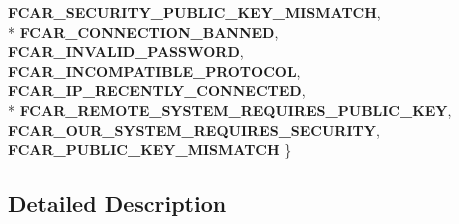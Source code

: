 \begin{DoxyCompactItemize}
{\bfseries F\-C\-A\-R\-\_\-\-S\-E\-C\-U\-R\-I\-T\-Y\-\_\-\-P\-U\-B\-L\-I\-C\-\_\-\-K\-E\-Y\-\_\-\-M\-I\-S\-M\-A\-T\-C\-H}, 
\\*
{\bfseries F\-C\-A\-R\-\_\-\-C\-O\-N\-N\-E\-C\-T\-I\-O\-N\-\_\-\-B\-A\-N\-N\-E\-D}, 
{\bfseries F\-C\-A\-R\-\_\-\-I\-N\-V\-A\-L\-I\-D\-\_\-\-P\-A\-S\-S\-W\-O\-R\-D}, 
{\bfseries F\-C\-A\-R\-\_\-\-I\-N\-C\-O\-M\-P\-A\-T\-I\-B\-L\-E\-\_\-\-P\-R\-O\-T\-O\-C\-O\-L}, 
{\bfseries F\-C\-A\-R\-\_\-\-I\-P\-\_\-\-R\-E\-C\-E\-N\-T\-L\-Y\-\_\-\-C\-O\-N\-N\-E\-C\-T\-E\-D}, 
\\*
{\bfseries F\-C\-A\-R\-\_\-\-R\-E\-M\-O\-T\-E\-\_\-\-S\-Y\-S\-T\-E\-M\-\_\-\-R\-E\-Q\-U\-I\-R\-E\-S\-\_\-\-P\-U\-B\-L\-I\-C\-\_\-\-K\-E\-Y}, 
{\bfseries F\-C\-A\-R\-\_\-\-O\-U\-R\-\_\-\-S\-Y\-S\-T\-E\-M\-\_\-\-R\-E\-Q\-U\-I\-R\-E\-S\-\_\-\-S\-E\-C\-U\-R\-I\-T\-Y}, 
{\bfseries F\-C\-A\-R\-\_\-\-P\-U\-B\-L\-I\-C\-\_\-\-K\-E\-Y\-\_\-\-M\-I\-S\-M\-A\-T\-C\-H}
 \}
\end{DoxyCompactItemize}


\subsection{Detailed Description}


